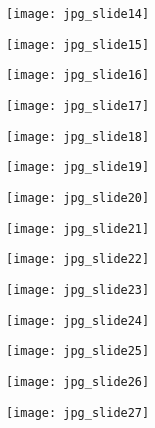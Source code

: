 \documentclass[main.tex]{subfiles}
\begin{document}
\begin{center}
\texttt{[image: jpg\_slide14]}
\end{center}

\begin{center}
\texttt{[image: jpg\_slide15]}
\end{center}

\begin{center}
\texttt{[image: jpg\_slide16]}
\end{center}

\begin{center}
\texttt{[image: jpg\_slide17]}
\end{center}

\begin{center}
\texttt{[image: jpg\_slide18]}
\end{center}

\begin{center}
\texttt{[image: jpg\_slide19]}
\end{center}

\begin{center}
\texttt{[image: jpg\_slide20]}
\end{center}

\begin{center}
\texttt{[image: jpg\_slide21]}
\end{center}

\begin{center}
\texttt{[image: jpg\_slide22]}
\end{center}

\begin{center}
\texttt{[image: jpg\_slide23]}
\end{center}

\begin{center}
\texttt{[image: jpg\_slide24]}
\end{center}

\begin{center}
\texttt{[image: jpg\_slide25]}
\end{center}

\begin{center}
\texttt{[image: jpg\_slide26]}
\end{center}

\begin{center}
\texttt{[image: jpg\_slide27]}
\end{center}
\end{document}
